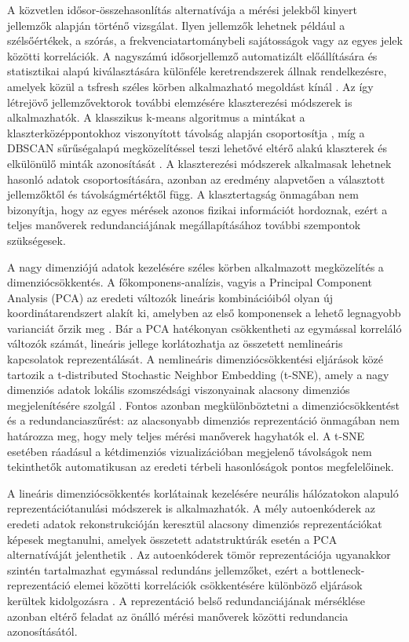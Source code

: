 \documentclass[12pt,a4paper,onehalfspacing, oneside]{book} %
\begin{document}
A közvetlen idősor-összehasonlítás alternatívája a mérési jelekből kinyert jellemzők alapján történő vizsgálat. Ilyen jellemzők lehetnek például a szélsőértékek, a szórás, a frekvenciatartománybeli sajátosságok vagy az egyes jelek közötti korrelációk. A nagyszámú idősorjellemző automatizált előállítására és statisztikai alapú kiválasztására különféle keretrendszerek állnak rendelkezésre, amelyek közül a tsfresh széles körben alkalmazható megoldást kínál \cite{christ2018time}. Az így létrejövő jellemzővektorok további elemzésére klaszterezési módszerek is alkalmazhatók. A klasszikus k-means algoritmus a mintákat a klaszterközéppontokhoz viszonyított távolság alapján csoportosítja \cite{mcqueen1967some}, míg a DBSCAN sűrűségalapú megközelítéssel teszi lehetővé eltérő alakú klaszterek és elkülönülő minták azonosítását \cite{ester1996density}. A klaszterezési módszerek alkalmasak lehetnek hasonló adatok csoportosítására, azonban az eredmény alapvetően a választott jellemzőktől és távolságmértéktől függ. A klasztertagság önmagában nem bizonyítja, hogy az egyes mérések azonos fizikai információt hordoznak, ezért a teljes manőverek redundanciájának megállapításához további szempontok szükségesek.

A nagy dimenziójú adatok kezelésére széles körben alkalmazott megközelítés a dimenziócsökkentés. A főkomponens-analízis, vagyis a Principal Component Analysis (PCA) az eredeti változók lineáris kombinációiból olyan új koordinátarendszert alakít ki, amelyben az első komponensek a lehető legnagyobb varianciát őrzik meg \cite{jolliffe2016principal}. Bár a PCA hatékonyan csökkentheti az egymással korreláló változók számát, lineáris jellege korlátozhatja az összetett nemlineáris kapcsolatok reprezentálását. A nemlineáris dimenziócsökkentési eljárások közé tartozik a t-distributed Stochastic Neighbor Embedding (t-SNE), amely a nagy dimenziós adatok lokális szomszédsági viszonyainak alacsony dimenziós megjelenítésére szolgál \cite{van2008visualizing}. Fontos azonban megkülönböztetni a dimenziócsökkentést és a redundanciaszűrést: az alacsonyabb dimenziós reprezentáció önmagában nem határozza meg, hogy mely teljes mérési manőverek hagyhatók el. A t-SNE esetében ráadásul a kétdimenziós vizualizációban megjelenő távolságok nem tekinthetők automatikusan az eredeti térbeli hasonlóságok pontos megfelelőinek.

A lineáris dimenziócsökkentés korlátainak kezelésére neurális hálózatokon alapuló reprezentációtanulási módszerek is alkalmazhatók. A mély autoenkóderek az eredeti adatok rekonstrukcióján keresztül alacsony dimenziós reprezentációkat képesek megtanulni, amelyek összetett adatstruktúrák esetén a PCA alternatíváját jelenthetik \cite{hinton2006reducing}. Az autoenkóderek tömör reprezentációja ugyanakkor szintén tartalmazhat egymással redundáns jellemzőket, ezért a bottleneck-reprezentáció elemei közötti korrelációk csökkentésére különböző eljárások kerültek kidolgozásra \cite{laakom2024reducing}. A reprezentáció belső redundanciájának mérséklése azonban eltérő feladat az önálló mérési manőverek közötti redundancia azonosításától.
\end{document}
